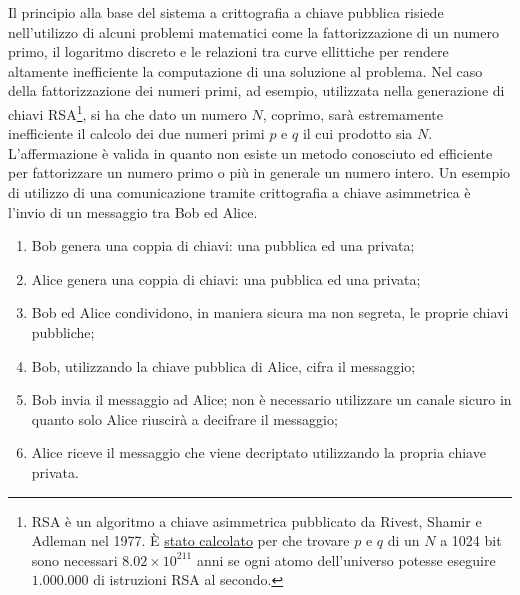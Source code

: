 Il principio alla base del sistema a crittografia a chiave pubblica risiede nell'utilizzo di alcuni problemi matematici come la fattorizzazione di un numero primo, il logaritmo discreto e le relazioni tra curve ellittiche per rendere altamente inefficiente la computazione di una soluzione al problema.\newline
Nel caso della fattorizzazione dei numeri primi, ad esempio, utilizzata nella generazione di chiavi RSA\footnote{RSA è un algoritmo a chiave asimmetrica pubblicato da Rivest, Shamir e Adleman nel 1977. È \href{https://slides.com/edoardorosa/breakingrsa#/2/5}{stato calcolato} per che trovare $p$ e $q$ di un $N$ a 1024 bit sono necessari $8.02\times 10^{211}$ anni se ogni atomo dell'universo potesse eseguire $1.000.000$ di istruzioni RSA al secondo.}, si ha che dato un numero $N$, coprimo, sarà estremamente inefficiente il calcolo dei due numeri primi $p$ e $q$ il cui prodotto sia $N$.
L'affermazione è valida in quanto non esiste un metodo conosciuto ed efficiente per fattorizzare un numero primo o più in generale un numero intero.\newline
Un esempio di utilizzo di una comunicazione tramite crittografia a chiave asimmetrica è l'invio di un messaggio tra Bob ed Alice.
\begin{enumerate}
    \item Bob genera una coppia di chiavi: una pubblica ed una privata;
    \item Alice genera una coppia di chiavi: una pubblica ed una privata;
    \item Bob ed Alice condividono, in maniera sicura ma non segreta, le proprie chiavi pubbliche;
    \item Bob, utilizzando la chiave pubblica di Alice, cifra il messaggio;
    \item Bob invia il messaggio ad Alice; non è necessario utilizzare un canale sicuro in quanto solo Alice riuscirà a decifrare il messaggio;
    \item Alice riceve il messaggio che viene decriptato utilizzando la propria chiave privata.
\end{enumerate}
